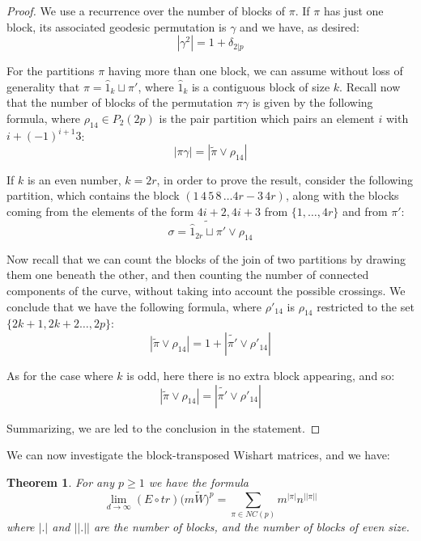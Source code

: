 \documentclass[12pt]{amsbook}
\newtheorem{theorem}{Theorem}[chapter]
\begin{document}
\begin{proof}
We use a recurrence over the number of blocks of $\pi$. If $\pi$ has just one block, its associated geodesic permutation is $\gamma$ and we have, as desired:
$$|\gamma^2|=1+\delta_{2|p}$$

For the partitions $\pi$ having more than one block, we can assume without loss of generality that $\pi = \hat 1_k \sqcup \pi'$, where $\hat 1_k$ is a contiguous block of size $k$. Recall now that the number of blocks of the permutation $\pi\gamma$ is given by the following formula, where $\rho_{14} \in P_2(2p)$ is the pair partition which pairs an element $i$ with $i+(-1)^{i+1}3$:
$$|\pi\gamma|=|\widetilde{\pi}\vee\rho_{14}|$$

If $k$ is an even number, $k=2r$, in order to prove the result, consider the following partition, which contains the block $(1 \, 4 \, 5 \, 8 \, \ldots 4r-3 \, 4r)$, along with the blocks coming from the elements of the form $4i+2, 4i+3$ from $\{1, \ldots, 4r\}$ and from $\pi'$:
$$\sigma=\widetilde{\hat 1_{2r} \sqcup \pi'}\vee \rho_{14}$$

Now recall that we can count the blocks of the join of two partitions by drawing them one beneath the other, and then counting the number of connected components of the curve, without taking into account the possible crossings. We conclude that we have the following formula, where $\rho'_{14}$ is $\rho_{14}$ restricted to the set $\{2k+1, 2k+2 \ldots, 2p\}$:
$$|\widetilde{\pi}\vee\rho_{14}|=1+|\widetilde{\pi'}\vee\rho'_{14}|$$

As for the case where $k$ is odd, here there is no extra block appearing, and so:
$$|\widetilde{\pi}\vee\rho_{14}|=|\widetilde{\pi'}\vee\rho'_{14}|$$

Summarizing, we are led to the conclusion in the statement.
\end{proof}

We can now investigate the block-transposed Wishart matrices, and we have:

\begin{theorem}
For any $p\geq 1$ we have the formula
$$\lim_{d\to\infty}(E\circ tr)\big(m\widetilde{W}\big)^p
=\sum_{\pi\in NC(p)}m^{|\pi|}n^{||\pi||}$$
where $|.|$ and $||.||$ are the number of blocks, and the number of blocks of even size. 
\end{theorem}
\end{document}
